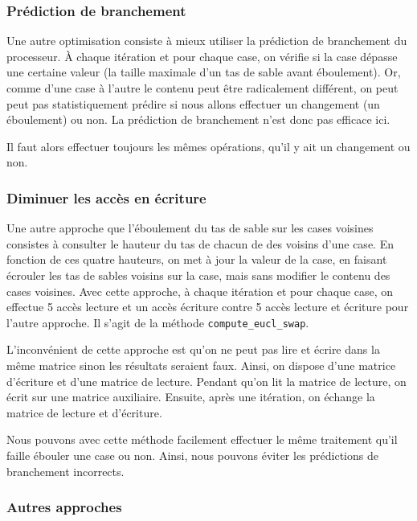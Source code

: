 \subsubsection{Prédiction de branchement}

Une autre optimisation consiste à mieux utiliser la prédiction de
branchement du processeur. À chaque itération et pour chaque case, on
vérifie si la case dépasse une certaine valeur (la taille maximale
d'un tas de sable avant éboulement). Or, comme d'une case à l'autre le
contenu peut être radicalement différent, on peut peut pas
statistiquement prédire si nous allons effectuer un changement (un
éboulement) ou non. La prédiction de branchement n'est donc pas
efficace ici.
\medskip

Il faut alors effectuer toujours les mêmes opérations, qu'il y ait
un changement ou non.
\medskip

\subsubsection{Diminuer les accès en écriture}

Une autre approche que l'éboulement du tas de sable sur les cases
voisines consistes à consulter le hauteur du tas de chacun de des
voisins d'une case. En fonction de ces quatre hauteurs, on met à jour
la valeur de la case, en faisant écrouler les tas de sables voisins
sur la case, mais sans modifier le contenu des cases voisines. Avec
cette approche, à chaque itération et pour chaque case, on effectue 5
accès lecture et un accès écriture contre 5 accès lecture et écriture
pour l'autre approche. Il s'agit de la méthode
\texttt{compute\_eucl\_swap}.
\medskip

L'inconvénient de cette approche est qu'on ne peut pas lire et écrire
dans la même matrice sinon les résultats seraient faux. Ainsi, on
dispose d'une matrice d'écriture et d'une matrice de lecture. Pendant
qu'on lit la matrice de lecture, on écrit sur une matrice
auxiliaire. Ensuite, après une itération, on échange la matrice de
lecture et d'écriture.
\medskip

Nous pouvons avec cette méthode facilement effectuer le même
traitement qu'il faille ébouler une case ou non. Ainsi, nous pouvons
éviter les prédictions de branchement incorrects.
\bigskip

\subsubsection{Autres approches}

